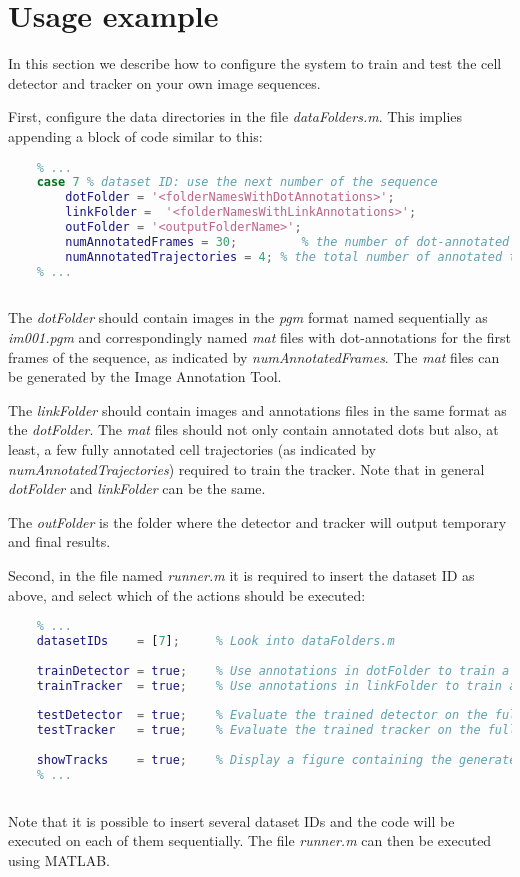 	\section{Usage example}
	
	In this section we describe how to configure the system to train and test the cell detector and tracker on your own image sequences.
	
	First, configure the data directories in the file \textit{dataFolders.m}. This implies appending a block of code similar to this:
	
	
	\begin{lstlisting}[language=Matlab]
	% dataFolders.m
	% ...
	case 7 % dataset ID: use the next number of the sequence
		dotFolder = '<folderNamesWithDotAnnotations>';
		linkFolder =  '<folderNamesWithLinkAnnotations>';
		outFolder = '<outputFolderName>';
		numAnnotatedFrames = 30;         % the number of dot-annotated frames 
		numAnnotatedTrajectories = 4; % the total number of annotated trajectories
	% ...
		        
	\end{lstlisting}
	
	The \textit{dotFolder} should contain images in the \textit{pgm} format named sequentially as \textit{im001.pgm} and correspondingly named \textit{mat} files with dot-annotations for the first frames of the sequence, as indicated by \textit{numAnnotatedFrames}. The \textit{mat} files can be generated by the Image Annotation Tool.
	
	The \textit{linkFolder} should contain images and annotations files in the same format as the \textit{dotFolder}. The \textit{mat} files should not only contain annotated dots but also, at least, a few fully annotated cell trajectories (as indicated by \textit{numAnnotatedTrajectories}) required to train the tracker. Note that in general \textit{dotFolder} and \textit{linkFolder} can be the same.
	
	The \textit{outFolder} is the folder where the detector and tracker will output temporary and final results.
	
	
	
	Second, in the file named \textit{runner.m} it is required to insert the dataset ID as above, and select which of the actions should be executed:
	
	
	\begin{lstlisting}[language=Matlab]
	% runner.m
	% ...
	datasetIDs    = [7];     % Look into dataFolders.m
	
	trainDetector = true;    % Use annotations in dotFolder to train a new detector
	trainTracker  = true;    % Use annotations in linkFolder to train a new tracker
	
	testDetector  = true;    % Evaluate the trained detector on the full image sequence
	testTracker   = true;    % Evaluate the trained tracker on the full image sequence
	
	showTracks    = true;    % Display a figure containing the generated trajectories
	% ...
       
	\end{lstlisting}
	
	Note that it is possible to insert several dataset IDs and the code will be executed on each of them sequentially. The file \textit{runner.m} can then be executed using MATLAB.
	
